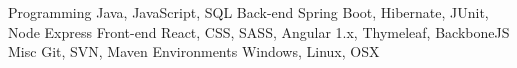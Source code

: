 
\begin{cvskills}
    \cvskill
        {Programming}
        {Java, JavaScript, SQL}
    \cvskill
        {Back-end}
        {Spring Boot, Hibernate, JUnit, Node Express}
    \cvskill
        {Front-end}
        {React, CSS, SASS, Angular 1.x, Thymeleaf, BackboneJS}
    \cvskill
        {Misc}
        {Git, SVN, Maven}
    \cvskill
        {Environments}
        {Windows, Linux, OSX}
\end{cvskills}

